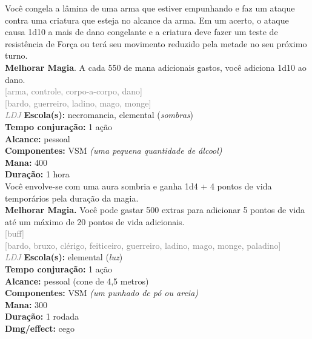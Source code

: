 \documentclass{RPG_Adventure}[2021/10/20]
\begin{document}
{\normalsize Você congela a lâmina de uma arma que estiver empunhando e faz um ataque contra uma criatura que esteja no alcance da arma. Em um acerto, o ataque causa 1d10 a mais de dano congelante e a criatura deve fazer um teste de resistência de Força ou terá seu movimento reduzido pela metade no seu próximo turno.\\\t \textbf{Melhorar Magia}. A cada 550 de mana adicionais gastos, você adiciona 1d10 ao dano.\\}
{\scriptsize \textcolor{gray}{[arma, controle, corpo-a-corpo, dano]\\}}
{\scriptsize \textcolor{gray}{[bardo, guerreiro, ladino, mago, monge]\\}}
{\tiny \textcolor{gray}{\textit{LDJ}}}
{\small \t \textbf{Escola(s):} necromancia, elemental (\textit{sombras})\\\t \textbf{Tempo conjuração:} 1 ação\\\t \textbf{Alcance:} pessoal\\\t \textbf{Componentes:} VSM \textit{(uma pequena quantidade de álcool)}\\\t \textbf{Mana:} 400\\\t \textbf{Duração:} 1 hora\\}
{\normalsize Você envolve-se com uma aura sombria e ganha 1d4 + 4 pontos de vida temporários pela duração da magia.\\\t \textbf{Melhorar Magia.} Você pode gastar 500 extras para adicionar 5 pontos de vida até um máximo de 20 pontos de vida adicionais.\\}
{\scriptsize \textcolor{gray}{[buff]\\}}
{\scriptsize \textcolor{gray}{[bardo, bruxo, clérigo, feiticeiro, guerreiro, ladino, mago, monge, paladino]\\}}
{\tiny \textcolor{gray}{\textit{LDJ}}}
{\small \t \textbf{Escola(s):} elemental (\textit{luz})\\\t \textbf{Tempo conjuração:} 1 ação\\\t \textbf{Alcance:} pessoal (cone de 4,5 metros)\\\t \textbf{Componentes:} VSM \textit{(um punhado de pó ou areia)}\\\t \textbf{Mana:} 300\\\t \textbf{Duração:} 1 rodada\\\t \textbf{Dmg/effect:} cego\\}
\end{document}
